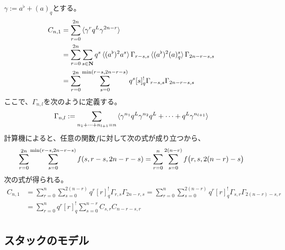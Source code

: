 {\begin{todo}[課題]
		$\gamma:=a^\flat+(a)_q$とする。
		\begin{equation*}\begin{split}
			C_{n,1} &= \sum_{r=0}^{2n} \mathinner{\langle{\gamma^rq^L\gamma^{2n-r}}\rangle} \\
			&= \sum_{r=0}^{2n}\sum_{s\in\mathbf{N}} q^s
				\mathinner{\langle{(a^\flat)^2a^s}\rangle} \Gamma_{r-s,s}
				\mathinner{\langle{(a^\flat)^2(a)_q^s}\rangle} \Gamma_{2n-r-s,s} \\
			&= \sum_{r=0}^{2n}\sum_{s=0}^{\min(r-s, 2n-r-s)} q^s [s]_q^!
				\Gamma_{r-s,s} \Gamma_{2n-r-s,s} \\
		\end{split}\end{equation*}
		ここで、$\Gamma_{n,l}$を次のように定義する。
		\begin{equation*}\begin{split}
			\Gamma_{n,l} := \sum_{n_1 +\cdots+ n_{l+1}=n} 
			\mathinner{\langle{\gamma^{n_1}q^L\gamma^{n_2}q^L +\cdots+ q^L\gamma^{n_{l+1}}}\rangle}
		\end{split}\end{equation*}
		計算機によると、任意の関数$f$に対して次の式が成り立つから、
		\begin{equation*}\begin{split}
			\sum_{r=0}^{2n}\sum_{s=0}^{\min(r-s, 2n-r-s)} f(s, r-s, 2n-r-s)
			= \sum_{r=0}^{n}\sum_{s=0}^{2(n-r)} f\bigl({r, s, 2(n-r) - s}\bigr)
		\end{split}\end{equation*}
		次の式が得られる。
		\begin{equation*}\begin{split}
			C_{n,1} &= \sum_{r=0}^{n}\sum_{s=0}^{2(n-r)} q^r [r]_q^!
				\Gamma_{r,s} \Gamma_{2n-r,s}
			= \sum_{r=0}^{n}\sum_{s=0}^{2(n-r)} q^r [r]_q^!
				\Gamma_{s,r} \Gamma_{2(n-r)-s,r} \\
			&= \sum_{r=0}^{n} q^r [r]_q^!\sum_{s=0}^{n-r} C_{s,r} C_{n-r-s,r} \\
		\end{split}\end{equation*}
	\end{todo} %
\subsection{スタックのモデル}\label{s2:スタックのモデル} %
}
